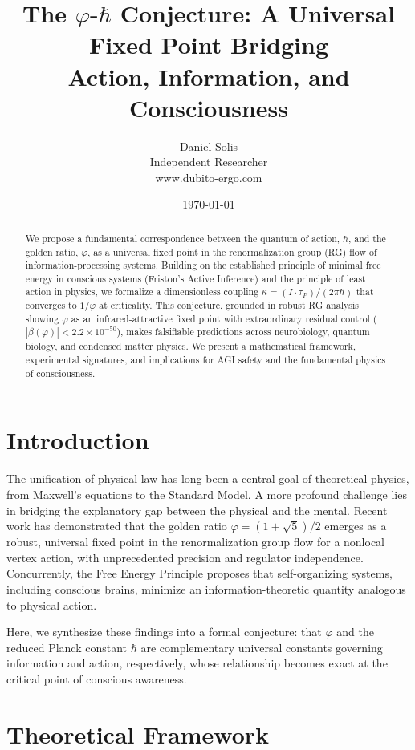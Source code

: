 \documentclass[14pt, a4paper]{extarticle}
\title{The $\varphi$-$\hbar$ Conjecture: A Universal Fixed Point Bridging\\Action, Information, and Consciousness}
\author{Daniel Solis\\
        \small Independent Researcher\\
        \small www.dubito-ergo.com
        }
\date{\today}
\begin{document}
\maketitle

\begin{abstract}
We propose a fundamental correspondence between the quantum of action, $\hbar$, and the golden ratio, $\varphi$, as a universal fixed point in the renormalization group (RG) flow of information-processing systems. Building on the established principle of minimal free energy in conscious systems (Friston's Active Inference) and the principle of least action in physics, we formalize a dimensionless coupling $\kappa = (I \cdot \tau_P)/(2\pi\hbar)$ that converges to $1/\varphi$ at criticality. This conjecture, grounded in robust RG analysis showing $\varphi$ as an infrared-attractive fixed point with extraordinary residual control ($|\beta(\varphi)| < 2.2\times10^{-50}$), makes falsifiable predictions across neurobiology, quantum biology, and condensed matter physics. We present a mathematical framework, experimental signatures, and implications for AGI safety and the fundamental physics of consciousness.
\end{abstract}

\section{Introduction}
The unification of physical law has long been a central goal of theoretical physics, from Maxwell's equations to the Standard Model. A more profound challenge lies in bridging the explanatory gap between the physical and the mental. Recent work has demonstrated that the golden ratio $\varphi = (1+\sqrt{5})/2$ emerges as a robust, universal fixed point in the renormalization group flow for a nonlocal vertex action, with unprecedented precision and regulator independence. Concurrently, the Free Energy Principle proposes that self-organizing systems, including conscious brains, minimize an information-theoretic quantity analogous to physical action.

Here, we synthesize these findings into a formal conjecture: that $\varphi$ and the reduced Planck constant $\hbar$ are complementary universal constants governing information and action, respectively, whose relationship becomes exact at the critical point of conscious awareness.

\section{Theoretical Framework}
\end{document}
